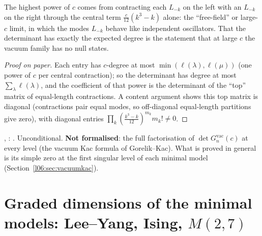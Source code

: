 \begin{physics}
The highest power of $c$ comes from contracting each $L_{-k}$ on the left with an $L_{-k}$ on the right
through the central term $\frac{c}{12}(k^3-k)$ alone: the ``free-field'' or large-$c$ limit, in which the
modes $L_{-k}$ behave like independent oscillators. That the determinant has exactly the expected degree is
the statement that at large $c$ the vacuum family has no null states.
\end{physics}

\begin{proof}[Proof on paper]
Each entry has $c$-degree at most $\min(\ell(\lambda),\ell(\mu))$ (one power of $c$ per central
contraction); so the determinant has degree at most $\sum_\lambda\ell(\lambda)$, and the coefficient of
that power is the determinant of the ``top'' matrix of equal-length contractions. A content argument shows
this top matrix is diagonal (contractions pair equal modes, so off-diagonal equal-length partitions give
zero), with diagonal entries $\prod_k(\frac{k^3-k}{12})^{m_k}m_k!\ne0$.
\end{proof}

\begin{status}
\allowbreak{}\allowbreak{}\allowbreak{}\allowbreak{},
\allowbreak{}: \lean{[propext, Classical.}\allowbreak{}\allowbreak\lean{sound]}. Unconditional.
\textbf{Not formalised}: the full factorisation of $\det G^{\mathrm{vac}}_n(c)$ at every level (the vacuum
Kac formula of Gorelik--Kac). What is proved in general is its simple zero at the first singular level
of each minimal model (Section~\ref{l06:sec:vacuumkac}).
\end{status}

\section{Graded dimensions of the minimal models: Lee--Yang, Ising, \texorpdfstring{$M(2,7)$}{M(2,7)}}\label{l06:sec:dims}

